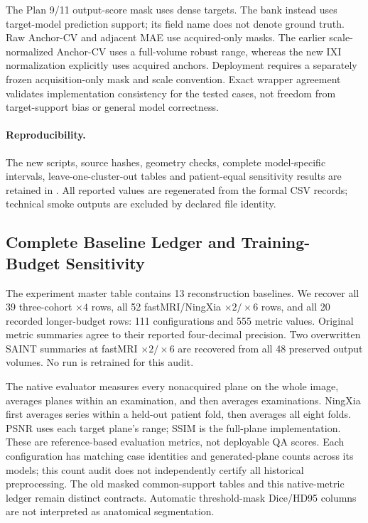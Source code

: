 The Plan 9/11 output-score mask uses dense targets. The bank instead uses target-model prediction support; its field name does not denote ground truth. Raw Anchor-CV and adjacent MAE use acquired-only masks. The earlier scale-normalized Anchor-CV uses a full-volume robust range, whereas the new IXI normalization explicitly uses acquired anchors. Deployment requires a separately frozen acquisition-only mask and scale convention. Exact wrapper agreement validates implementation consistency for the tested cases, not freedom from target-support bias or general model correctness.

\paragraph{Reproducibility.}
The new scripts, source hashes, geometry checks, complete model-specific intervals, leave-one-cluster-out tables and patient-equal sensitivity results are retained in . All reported values are regenerated from the formal CSV records; technical smoke outputs are excluded by declared file identity.


\subsection{Complete Baseline Ledger and Training-Budget Sensitivity}
The experiment master table contains 13 reconstruction baselines. We recover all 39 three-cohort $\times4$ rows, all 52 fastMRI/NingXia $\times2/\times6$ rows, and all 20 recorded longer-budget rows: 111 configurations and 555 metric values. Original metric summaries agree to their reported four-decimal precision. Two overwritten SAINT summaries at fastMRI $\times2/\times6$ are recovered from all 48 preserved output volumes. No run is retrained for this audit.

The native evaluator measures every nonacquired plane on the whole image, averages planes within an examination, and then averages examinations. NingXia first averages series within a held-out patient fold, then averages all eight folds. PSNR uses each target plane's range; SSIM is the full-plane implementation. These are reference-based evaluation metrics, not deployable QA scores. Each configuration has matching case identities and generated-plane counts across its models; this count audit does not independently certify all historical preprocessing. The old masked common-support tables and this native-metric ledger remain distinct contracts. Automatic threshold-mask Dice/HD95 columns are not interpreted as anatomical segmentation.

